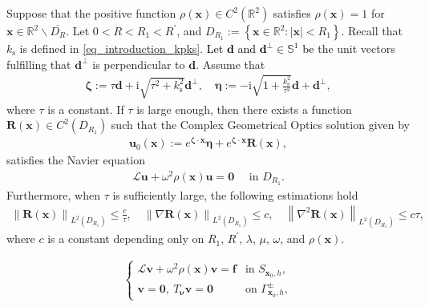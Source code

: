 \documentclass[10pt,a4paper]{amsart}
\begin{document}
\begin{lemma} \label{lem_CGOs}
	Suppose that the positive function $ \rho\left(\mathbf{x}\right)\in C^2\left(\mathbb{R}^2\right) $ satisfies $ \rho\left(\mathbf{x}\right)=1 $ for $ \mathbf{x}\in\mathbb{R}^2 \backslash \overline{D_R} $. Let $ 0 < R < R_1 < R^{\prime} $, and $ D_{R_1}:=\left\{\mathbf{x} \in \mathbb{R}^2:\left| \mathbf{x} \right|< R_1\right\} $. Recall that $ k_{\mathrm{s}} $ is defined in \eqref{eq_introduction_kpks}. \textcolor{black}{Let $ \mathbf{d} $ and $ \mathbf{d}^{\perp}\in \mathbb{S}^1 $ be} the unit vectors fulfilling that $ \mathbf{d}^{\perp} $ is perpendicular to $ \mathbf{d} $. Assume that 
	\begin{align} \label{def_IP_zeta_eta}
		\bm{\zeta} := \tau \mathbf{d} + \mathrm{i}\sqrt{ \tau^2 + k_{\mathrm{s}}^2 } \mathbf{d}^{\perp}, \quad \bm{\eta} := - \mathrm{i} \sqrt{ 1 + \frac{k_{\mathrm{s}}^2}{\tau^2}} \mathbf{d} + \mathbf{d}^\perp,
	\end{align}
	where $ \tau $ is a constant. If $\tau$ is large enough, then there exists a function  $ \mathbf{R}\left(\mathbf{x}\right)\in C^2\left(D_{R_1}\right) $ such that the Complex Geometrical Optics solution given by
	\begin{align} \label{def_CGOs_u0}
		\mathbf{u}_0 \left(\mathbf{x}\right) := e^{\bm{\zeta} \cdot \mathbf{x}} \bm{\eta} + e^{\bm{\zeta} \cdot \mathbf{x}} \mathbf{R}\left(\mathbf{x}\right), 
	\end{align}
	satisfies the Navier equation 
	\begin{align} \label{eq_CGOs_Navier_equation_no_source}
		\mathcal{L} \mathbf{u} + \omega^2 \rho\left(\mathbf{x}\right) \mathbf{u} = \bm{0} \quad \text{ in } D_{R_1}.
	\end{align}
	Furthermore, when $ \tau $ is sufficiently large, the following estimations hold
	\begin{align} \label{est_inverse_problem_CGO}
		\left\| \mathbf{R} \left(\mathbf{x}\right) \right\|_{L^2 \left(D_{R_1}\right)} \leqslant \frac{c}{\tau}, \quad \left\| \nabla \mathbf{R} \left(\mathbf{x}\right) \right\|_{L^2 \left(D_{R_1}\right)} \leqslant c, \quad \left\| \nabla^2 \mathbf{R} \left(\mathbf{x}\right) \right\|_{L^2 \left(D_{R_1}\right)} \leqslant c \tau, 
	\end{align}
	where $ c $ is a constant depending only on $ R_1 $, $ R^{\prime} $, $ \lambda $, $ \mu $, $ \omega $, and $ \rho\left(\mathbf{x}\right) $.
\end{lemma}

\begin{align} \label{model_part_v_Sh}
	\begin{cases}
		\mathcal{L} \mathbf{v} + \omega^2 \rho\left(\mathbf{x}\right) \mathbf{v} = \mathbf{f} & \text{in } S_{\mathbf{x}_0,h} , \\
		\mathbf{v} = \bm{0}, \ T_{\bm{\nu}} \mathbf{v} = \bm{0} & \text {on } \Gamma_{\mathbf{x}_0,h}^\pm,
	\end{cases}
\end{align}
\end{document}
